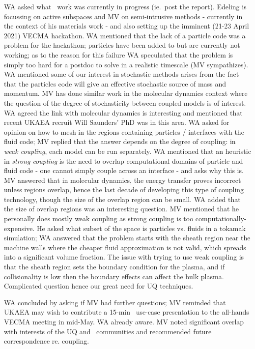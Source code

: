 WA asked what \nep\  work was currently in progress (ie.\ post the report).  
Edeling is focussing on active subspaces and MV on semi-intrusive methods - 
currently in the context of his materials work - and also setting up the 
imminent (21-23 April 2021) VECMA hackathon.  WA mentioned that the lack of 
a particle code was a problem for the hackathon; particles have been added to 
 but are currently not working; as to the reason for this failure WA 
speculated that the problem is simply too hard for a postdoc to solve in a 
realistic timescale (MV sympathizes).  WA mentioned some of our interest in 
stochastic methods arises from the fact that the particles code will give an 
effective stochastic source of mass and momentum.  MV has done similar work in 
the molecular dynamics context where the question of the degree of 
stochasticity between coupled models is of interest.  WA agreed the link with 
molecular dynamics is interesting and mentioned that recent UKAEA recruit Will 
Saunders' PhD was in this area.  WA asked for opinion on how to mesh in the 
regions containing particles / interfaces with the fluid code; MV replied that 
the answer depends on the degree of coupling: in {\it weak coupling}, each 
model can be run separately.  WA mentioned that an heuristic in {\it strong 
coupling} is the need to overlap computational domains of particle and fluid 
code - one cannot simply couple across an interface - and asks why this is.  MV 
answered that in molecular dynamics, the energy transfer proves incorrect 
unless regions overlap, hence the last decade of developing this type of 
coupling technology, though the size of the overlap region can be small.  WA 
added that the size of overlap regions was an interesting question.  MV 
mentioned that he personally does mostly weak coupling as strong coupling is 
too computationally-expensive.  He asked what subset of the space is particles 
vs. fluids in a tokamak simulation; WA answered that the problem starts with 
the sheath region near the machine walls where the cheaper fluid approximation is not 
valid, which spreads into a significant volume fraction.  The issue with trying 
to use weak coupling is that the sheath region sets the boundary condition for the 
plasma, and if collisionality is low then the boundary effects can affect the 
bulk plasma.  Complicated question hence our great need for UQ techniques.

WA concluded by asking if MV had further questions; MV reminded that UKAEA may 
wish to contribute a 15-min \nep\  use-case presentation to the all-hands 
VECMA meeting in mid-May.  WA already aware.  MV noted significant overlap 
with interests of the UQ and \nep\  communities and recommended future 
correspondence re. coupling.


